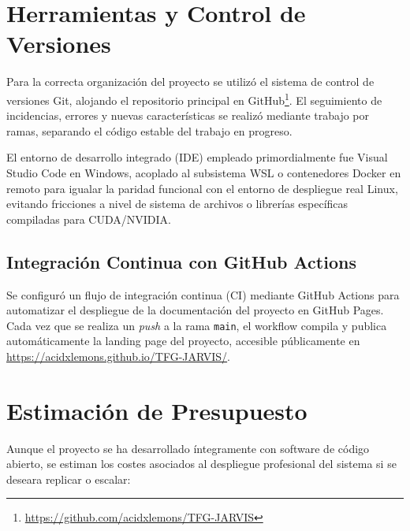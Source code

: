 \section{Herramientas y Control de Versiones}
Para la correcta organización del proyecto se utilizó el sistema de control de versiones Git, alojando el repositorio principal en GitHub\footnote{\url{https://github.com/acidxlemons/TFG-JARVIS}}. El seguimiento de incidencias, errores y nuevas características se realizó mediante trabajo por ramas, separando el código estable del trabajo en progreso.

El entorno de desarrollo integrado (IDE) empleado primordialmente fue Visual Studio Code en Windows, acoplado al subsistema WSL o contenedores Docker en remoto para igualar la paridad funcional con el entorno de despliegue real Linux, evitando fricciones a nivel de sistema de archivos o librerías específicas compiladas para CUDA/NVIDIA.

\subsection{Integración Continua con GitHub Actions}
Se configuró un flujo de integración continua (CI) mediante GitHub Actions para automatizar el despliegue de la documentación del proyecto en GitHub Pages. Cada vez que se realiza un \textit{push} a la rama \texttt{main}, el workflow compila y publica automáticamente la landing page del proyecto, accesible públicamente en \url{https://acidxlemons.github.io/TFG-JARVIS/}.

\section{Estimación de Presupuesto}

Aunque el proyecto se ha desarrollado íntegramente con software de código abierto, se estiman los costes asociados al despliegue profesional del sistema si se deseara replicar o escalar:

